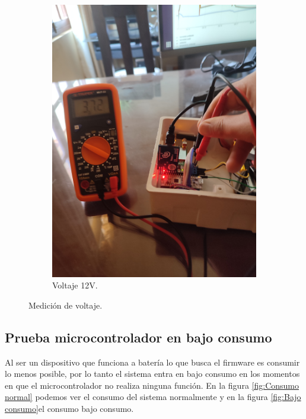 \begin{figure}[h!]
\begin{subfigure}[b]{0.28\linewidth}
  \includegraphics[width=\linewidth]{./Figures/voltaje3v.jpg}
  \caption{Voltaje 12V.}
  \label{fig:Medicion de voltaje 12v}
  \end{subfigure}
  \caption{Medición de voltaje.}
  \label{fig:Medicion de voltaje}
\end{figure}

\subsection{Prueba microcontrolador en bajo consumo }
Al ser un dispositivo que funciona a batería lo que busca el firmware es consumir lo menos posible, por lo tanto el sistema entra en bajo consumo en los momentos en que el microcontrolador no realiza ninguna función. 
En la figura \ref{fig:Consumo normal} podemos ver el consumo del sistema normalmente y en la figura \ref{fig:Bajo consumo}el consumo bajo consumo.

